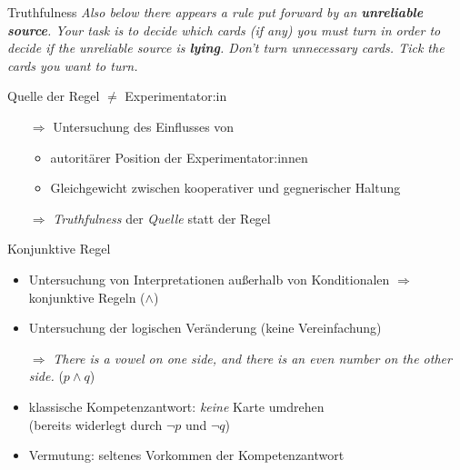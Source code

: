 \begin{frame}{Truthfulness {\scriptsize \cite[S.~97-98]{stenningHumanReasoningCognitive2008}}}
    \emph{ \small
        Also below there appears a rule {\normalsize \alert{put forward by an \textbf{unreliable source}}}.
        Your task is to decide which cards (if any) you must turn in order to decide {\normalsize \alert{if the unreliable source is \textbf{lying}}}.
        Don't turn unnecessary cards. Tick the cards you want to turn.
    }
    
    Quelle der Regel $\ne$ Experimentator:in

    \pause
    \begin{itemize}
        \item[$\Rightarrow$] Untersuchung des Einflusses von
        \begin{itemize}
            \item autoritärer Position der Experimentator:innen
            \item Gleichgewicht zwischen kooperativer und gegnerischer Haltung
        \end{itemize}

        \item[$\Rightarrow$] \emph{Truthfulness} der \emph{Quelle} statt der Regel
    \end{itemize}
\end{frame}


\begin{frame}{Konjunktive Regel {\scriptsize \cite[S.~99]{stenningHumanReasoningCognitive2008}}}
    \begin{itemize}
        \item Untersuchung von Interpretationen außerhalb von Konditionalen
            $\Rightarrow$ konjunktive Regeln ($\land$)
        
        \item Untersuchung der logischen Veränderung (keine Vereinfachung)
        
        \item[$\Rightarrow$] \emph{There is a vowel on one side, \alert{and} there is an even number on the other side.} ($p \land q$)
        
        \pause
        \item klassische Kompetenzantwort: \emph{keine} Karte umdrehen \\
            {\footnotesize (bereits widerlegt durch $\lnot p$ und $\lnot q$)}
        
        \item Vermutung: seltenes Vorkommen der Kompetenzantwort
    \end{itemize}
\end{frame}



